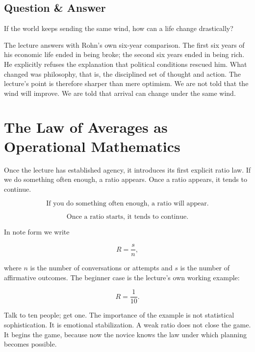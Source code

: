 \subsection{Question \& Answer}

If the world keeps sending the same wind, how can a life change drastically?

The lecture answers with Rohn's own six-year comparison. The first six years of his economic life ended in being broke; the second six years ended in being rich. He explicitly refuses the explanation that political conditions rescued him. What changed was philosophy, that is, the disciplined set of thought and action. The lecture's point is therefore sharper than mere optimism. We are not told that the wind will improve. We are told that arrival can change under the same wind.

\section{The Law of Averages as Operational Mathematics}

Once the lecture has established agency, it introduces its first explicit ratio law. If we do something often enough, a ratio appears. Once a ratio appears, it tends to continue.

\begin{equation}
\text{If you do something often enough, a ratio will appear.}
\end{equation}

\begin{equation}
\text{Once a ratio starts, it tends to continue.}
\end{equation}

In note form we write

\begin{equation}
R = \frac{s}{n},
\end{equation}

where \(n\) is the number of conversations or attempts and \(s\) is the number of affirmative outcomes. The beginner case is the lecture's own working example:

\begin{equation}
R=\frac{1}{10}.
\end{equation}

Talk to ten people; get one. The importance of the example is not statistical sophistication. It is emotional stabilization. A weak ratio does not close the game. It begins the game, because now the novice knows the law under which planning becomes possible.

